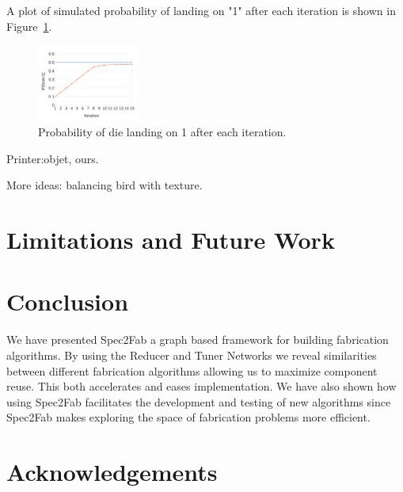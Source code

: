 \documentclass[annual]{acmsiggraph}
\begin{document}
A plot of simulated probability of landing on "1" after each iteration
is shown in Figure~\ref{fig:dieErr}.

\begin{figure}
	\centering
 	\includegraphics[width=0.3\textwidth]{figure/die.pdf}
\caption{Probability of die landing on 1 after each iteration.}
\label{fig:dieErr}
\end{figure}

Printer:objet, ours.

More ideas:
balancing bird with texture.
\section{Limitations and Future Work}


\section{Conclusion}
We have presented Spec2Fab a graph based framework for building fabrication algorithms. By using the Reducer and Tuner Networks we reveal similarities between different fabrication algorithms allowing us to maximize component reuse. This both accelerates and eases implementation. We have also shown how using Spec2Fab facilitates the development and testing of new algorithms since Spec2Fab makes exploring the space of fabrication problems more efficient.
\section*{Acknowledgements}



\end{document}
